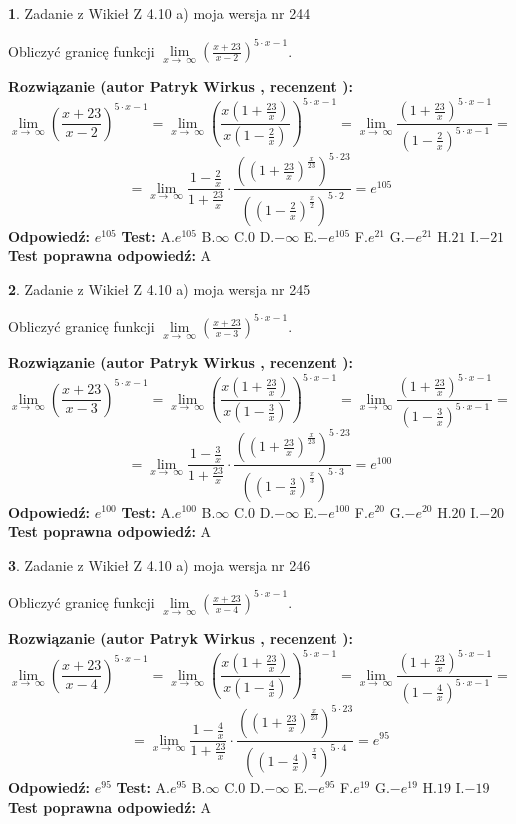 \documentclass[12pt, a4paper]{article}
\theoremstyle{definition} %
\newtheorem{zad}{}
\newcommand{\zadStart}[1]{\begin{zad}#1\newline}
\newcommand{\zadStop}{\end{zad}}
\newcommand{\rozwStart}[2]{\noindent \textbf{Rozwiązanie (autor #1 , recenzent #2): }\newline}
\newcommand{\rozwStop}{\newline}
\newcommand{\odpStart}{\noindent \textbf{Odpowiedź:}\newline}
\newcommand{\odpStop}{\newline}
\newcommand{\testStart}{\noindent \textbf{Test:}\newline}
\newcommand{\testStop}{\newline}
\newcommand{\kluczStart}{\noindent \textbf{Test poprawna odpowiedź:}\newline}
\newcommand{\kluczStop}{\newline}
\begin{document}
\zadStart{Zadanie z Wikieł Z 4.10 a) moja wersja nr 244}

Obliczyć granicę funkcji  $\lim\limits_{x\to\ \infty}(\frac{x+23}{x-2})^{5\cdot x-1}$.
\zadStop
\rozwStart{Patryk Wirkus}{}
$$\lim\limits_{x\to\ \infty}(\frac{x+23}{x-2})^{5\cdot x-1} = \lim\limits_{x\to\ \infty}(\frac{x(1+\frac{23}{x})}{x(1-\frac{2}{x})})^{5\cdot x-1}=\lim\limits_{x\to\ \infty}\frac{(1+\frac{23}{x})^{5\cdot x-1}}{(1-\frac{2}{x})^{5\cdot x-1}}=$$
$$=\lim\limits_{x\to\ \infty}\frac{1-\frac{2}{x}}{1+\frac{23}{x}}\cdot\frac{((1+\frac{23}{x})^{\frac{x}{23}})^{5\cdot23}}{((1-\frac{2}{x})^{\frac{x}{2}})^{5\cdot2}}=e^{105}$$
\rozwStop
\odpStart
$e^{105}$
\odpStop
\testStart
A.$e^{105}$ B.$\infty$ C.$0$ D.$-\infty$ E.$-e^{105}$
F.$e^{21}$ G.$-e^{21}$
H.$21$
I.$-21$
\testStop
\kluczStart
A
\kluczStop



\zadStart{Zadanie z Wikieł Z 4.10 a) moja wersja nr 245}

Obliczyć granicę funkcji  $\lim\limits_{x\to\ \infty}(\frac{x+23}{x-3})^{5\cdot x-1}$.
\zadStop
\rozwStart{Patryk Wirkus}{}
$$\lim\limits_{x\to\ \infty}(\frac{x+23}{x-3})^{5\cdot x-1} = \lim\limits_{x\to\ \infty}(\frac{x(1+\frac{23}{x})}{x(1-\frac{3}{x})})^{5\cdot x-1}=\lim\limits_{x\to\ \infty}\frac{(1+\frac{23}{x})^{5\cdot x-1}}{(1-\frac{3}{x})^{5\cdot x-1}}=$$
$$=\lim\limits_{x\to\ \infty}\frac{1-\frac{3}{x}}{1+\frac{23}{x}}\cdot\frac{((1+\frac{23}{x})^{\frac{x}{23}})^{5\cdot23}}{((1-\frac{3}{x})^{\frac{x}{3}})^{5\cdot3}}=e^{100}$$
\rozwStop
\odpStart
$e^{100}$
\odpStop
\testStart
A.$e^{100}$ B.$\infty$ C.$0$ D.$-\infty$ E.$-e^{100}$
F.$e^{20}$ G.$-e^{20}$
H.$20$
I.$-20$
\testStop
\kluczStart
A
\kluczStop



\zadStart{Zadanie z Wikieł Z 4.10 a) moja wersja nr 246}

Obliczyć granicę funkcji  $\lim\limits_{x\to\ \infty}(\frac{x+23}{x-4})^{5\cdot x-1}$.
\zadStop
\rozwStart{Patryk Wirkus}{}
$$\lim\limits_{x\to\ \infty}(\frac{x+23}{x-4})^{5\cdot x-1} = \lim\limits_{x\to\ \infty}(\frac{x(1+\frac{23}{x})}{x(1-\frac{4}{x})})^{5\cdot x-1}=\lim\limits_{x\to\ \infty}\frac{(1+\frac{23}{x})^{5\cdot x-1}}{(1-\frac{4}{x})^{5\cdot x-1}}=$$
$$=\lim\limits_{x\to\ \infty}\frac{1-\frac{4}{x}}{1+\frac{23}{x}}\cdot\frac{((1+\frac{23}{x})^{\frac{x}{23}})^{5\cdot23}}{((1-\frac{4}{x})^{\frac{x}{4}})^{5\cdot4}}=e^{95}$$
\rozwStop
\odpStart
$e^{95}$
\odpStop
\testStart
A.$e^{95}$ B.$\infty$ C.$0$ D.$-\infty$ E.$-e^{95}$
F.$e^{19}$ G.$-e^{19}$
H.$19$
I.$-19$
\testStop
\kluczStart
A
\kluczStop
\end{document}
